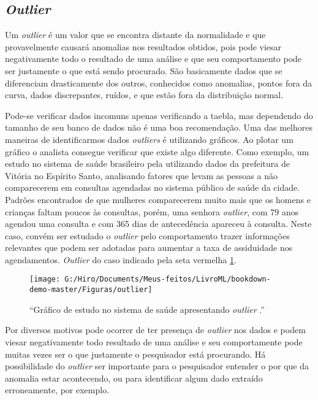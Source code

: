 \documentclass[
  openany]{book}
\begin{document}
\hypertarget{outlier}{%
\subsection{\texorpdfstring{\emph{Outlier}}{Outlier}}\label{outlier}}

Um \emph{outlier} é um valor que se encontra distante da normalidade e que provavelmente causará anomalias nos resultados obtidos, pois pode viesar negativamente todo o resultado de uma análise e que seu comportamento pode ser justamente o que está sendo procurado. São basicamente dados que se diferenciam drasticamente dos outros, conhecidos como anomalias, pontos fora da curva, dados discrepantes, ruídos, e que estão fora da distribuição normal.

Pode-se verificar dados incomuns apenas verificando a taebla, mas dependendo do tamanho de seu banco de dados não é uma boa recomendação. Uma das melhores maneiras de identificarmos dados \emph{outliers} é utilizando gráficos. Ao plotar um gráfico o analista consegue verificar que existe algo diferente. Como exemplo, um estudo no sistema de saúde brasileiro pela \citet{aquarela} utilizando dados da prefeitura de Vitória no Espírito Santo, analisando fatores que levam as pessoas a não comparecerem em consultas agendadas no sistema público de saúde da cidade. Padrões encontrados de que mulheres comparecerem muito mais que os homens e crianças faltam poucos às consultas, porém, uma senhora \emph{outlier}, com 79 anos agendou uma consulta e com 365 dias de antecedência apareceu à consulta. Neste caso, convém ser estudado o \emph{outlier} pelo comportamento trazer informações relevantes que podem ser adotadas para aumentar a taxa de assiduidade nos agendamentos. \emph{Outlier} do caso indicado pela seta vermelha \ref{fig:outlier}.

\begin{figure}

{\centering \texttt{[image: G:/Hiro/Documents/Meus-feitos/LivroML/bookdown-demo-master/Figuras/outlier]} 

}

\caption{``Gráfico de estudo no sistema de saúde apresentando \emph{outlier} \citep{aquarela}.''}\label{fig:outlier}
\end{figure}



Por diversos motivos pode ocorrer de ter presença de \emph{outlier} nos dados e podem viesar negativamente todo resultado de uma análise e seu comportamente pode muitas vezes ser o que justamente o pesquisador está procurando. Há possibilidade do \emph{outlier} ser importante para o pesquisador entender o por que da anomalia estar acontecendo, ou para identificar algum dado extraído erroneamente, por exemplo.
\end{document}
